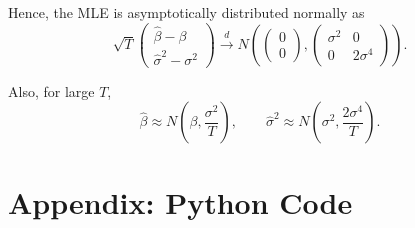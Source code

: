 \documentclass[12pt]{article}
\begin{document}
Hence, the MLE is asymptotically distributed normally as
\[
\sqrt{T}
\begin{pmatrix}
\hat{\beta}-\beta\\
\hat{\sigma}^2-\sigma^2
\end{pmatrix}
\xrightarrow{d}
N\left(
\begin{pmatrix}
0\\
0
\end{pmatrix},
\begin{pmatrix}
\sigma^2 & 0\\
0 & 2\sigma^4
\end{pmatrix}
\right).
\]

Also, for large \(T\),
\[
\hat{\beta}\approx N\left(\beta,\frac{\sigma^2}{T}\right),
\qquad
\hat{\sigma}^2\approx N\left(\sigma^2,\frac{2\sigma^4}{T}\right).
\]


\newpage

\appendix
\section*{Appendix: Python Code}
\end{document}
